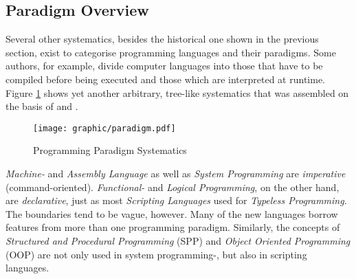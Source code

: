%
%
%
%
%
%
%

\subsection{Paradigm Overview}
\label{paradigm_overview_heading}

Several other systematics, besides the historical one shown in the previous
section, exist to categorise programming languages and their paradigms. Some
authors, for example, divide computer languages into those that have to be
compiled before being executed and those which are interpreted at runtime.
Figure \ref{paradigm_figure} shows yet another arbitrary, tree-like systematics
that was assembled on the basis of \cite{wikipedia} and \cite{kinnersley}.

\begin{figure}[ht]
    \begin{center}
        \texttt{[image: graphic/paradigm.pdf]}
        \caption{Programming Paradigm Systematics}
        \label{paradigm_figure}
    \end{center}
\end{figure}

\emph{Machine-} and \emph{Assembly Language} as well as \emph{System Programming}
are \emph{imperative} (command-oriented). \emph{Functional-} and
\emph{Logical Programming}, on the other hand, are \emph{declarative}, just as
most \emph{Scripting Languages} used for \emph{Typeless Programming}. The
boundaries tend to be vague, however. Many of the new languages borrow features
from more than one programming paradigm. Similarly, the concepts of
\emph{Structured and Procedural Programming} (SPP) and
\emph{Object Oriented Programming} (OOP) are not only used in system
programming-, but also in scripting languages.

